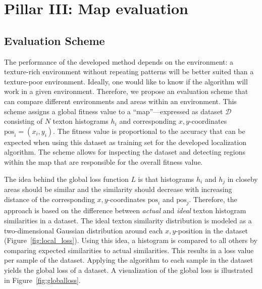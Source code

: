 \documentclass[11pt]{report}
\begin{document}
\section{Pillar III: Map evaluation}
\label{sec:mapeval}

\subsection{Evaluation Scheme}
\label{sec:evaluationscheme}

The performance of the developed method depends on the environment: a
texture-rich environment without repeating patterns will be better
suited than a texture-poor environment. Ideally, one would like to
know if the algorithm will work in a given environment. Therefore, we
propose an evaluation scheme that can compare different environments
and areas within an environment. This scheme assigns a global fitness
value to a ``map''---expressed as dataset $\mathcal{D}$ consisting of
$N$ texton histograms $h_i$ and corresponding $x,y$-coordinates
$\text{pos}_i = (x_i, y_i)$. The fitness value is proportional to the
accuracy that can be expected when using this dataset as training set
for the developed localization algorithm. The scheme allows for
inspecting the dataset and detecting regions within the map that are
responsible for the overall fitness value.

The idea behind the global loss function $L$ is that histograms $h_i$
and $h_j$ in closeby areas should be similar and the similarity should
decrease with increasing distance of the corresponding
$x,y$-coordinates $\text{pos}_i$ and $\text{pos}_j$. Therefore, the
approach is based on the difference between \emph{actual} and
\emph{ideal} texton histogram similarities in a dataset. The ideal
texton similarity distribution is modeled as a two-dimensional
Gaussian distribution around each $x,y$-position in the dataset
(Figure~\ref{fig:local_loss}). Using this idea, a histogram is
compared to all others by comparing expected similarities to actual
similarities. This results in a loss value per sample of the
dataset. Applying the algorithm to each sample in the dataset yields
the global loss of a dataset. A visualization of the global loss is
illustrated in Figure~\ref{fig:globalloss}.
\end{document}

